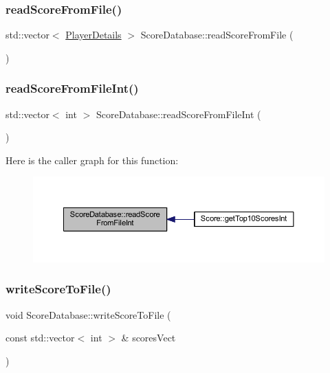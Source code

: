 \subsubsection{\texorpdfstring{read\+Score\+From\+File()}{readScoreFromFile()}}
{\footnotesize\ttfamily std\+::vector$<$ \hyperlink{struct_player_details}{Player\+Details} $>$ Score\+Database\+::read\+Score\+From\+File (\begin{DoxyParamCaption}{ }\end{DoxyParamCaption})}

\mbox{\label{class_score_database_a64030d31fa7a362d17de1172fed3189f}} 
\subsubsection{\texorpdfstring{read\+Score\+From\+File\+Int()}{readScoreFromFileInt()}}
{\footnotesize\ttfamily std\+::vector$<$ int $>$ Score\+Database\+::read\+Score\+From\+File\+Int (\begin{DoxyParamCaption}{ }\end{DoxyParamCaption})}

Here is the caller graph for this function\+:\nopagebreak
\begin{figure}[H]
\begin{center}
\leavevmode
\includegraphics[width=350pt]{class_score_database_a64030d31fa7a362d17de1172fed3189f_icgraph}
\end{center}
\end{figure}
\mbox{\label{class_score_database_a8e479ebb5c08413a4f34c9b0d019ff0e}} 
\subsubsection{\texorpdfstring{write\+Score\+To\+File()}{writeScoreToFile()}}
{\footnotesize\ttfamily void Score\+Database\+::write\+Score\+To\+File (\begin{DoxyParamCaption}\item[{const std\+::vector$<$ int $>$ \&}]{scores\+Vect }\end{DoxyParamCaption})}

